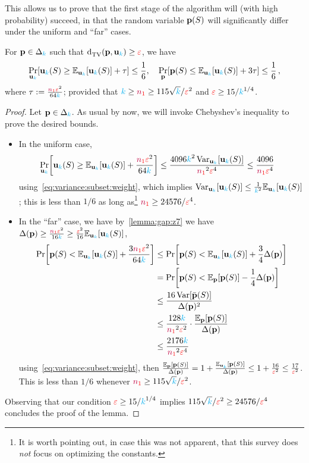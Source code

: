 This allows us to prove that the first stage of the algorithm will (with high probability) succeed, in that the random variable $\mathbf{p}(S)$ will significantly differ under the uniform and ``far'' cases. 
\begin{lemma}
  \label{lemma:empirical:subset:guarantee:pS}
  For $\mathbf{p}\in\Delta_{{\textcolor{cyan}{k}}}$ such that $\totalvardist{\p}{\uniform_\ab} \geq \dst$, we have
  \[
  \bP{\uniform_\ab}{\uniform_\ab(S) \geq \bE{\uniform_\ab}{\uniform_\ab(S)} + \tau} \leq \frac{1}{6}
  , \quad
  \bP{\p}{\p(S) \leq \bE{\uniform_\ab}{\uniform_\ab(S)} + 3\tau} \leq \frac{1}{6}\,,
  \]
  where $\tau := \frac{\textcolor{red}{{\textcolor{purple}{n}}_1}\textcolor{red}{\varepsilon}^2}{64{\textcolor{cyan}{k}}}$; provided that ${\textcolor{cyan}{k}} \geq \textcolor{red}{{\textcolor{purple}{n}}_1} \geq 115\sqrt{{\textcolor{cyan}{k}}}/\textcolor{red}{\varepsilon}^2$ and $\textcolor{red}{\varepsilon} \geq 15/{\textcolor{cyan}{k}}^{1/4}$.
\end{lemma}
\begin{proof}
Let $\mathbf{p}\in\Delta_{{\textcolor{cyan}{k}}}$. As usual by now, we will invoke Chebyshev's inequality to prove the desired bounds.
\begin{itemize}
    \item In the uniform case, 
    \begin{align*}
    \bP{\uniform_\ab}{\uniform_\ab(S) \geq \bE{\uniform_\ab}{\uniform_\ab(S)} + \frac{\nss\dst^2}{64\ab}} 
    &\leq \frac{4096\ab^2\Var_{\uniform_\ab}[\uniform_\ab(S)]}{\nss^2\dst^4} 
    \leq \frac{4096}{\nss\dst^4}
    \end{align*}
    using~\cref{eq:variance:subset:weight}, which implies $\Var_{\uniform_\ab}[\uniform_\ab(S)] \leq \frac{1}{\ab^2}\bE{\uniform_\ab}{\uniform_\ab(S)}$; this is less than $1/6$ as long as\footnote{It is worth pointing out, in case this was not apparent, that this survey does \emph{not} focus on optimizing the constants.} $\textcolor{red}{{\textcolor{purple}{n}}_1} \geq 24576/\textcolor{red}{\varepsilon}^4$.
    \item In the ``far'' case, we have by~\cref{lemma:gap:z7} we have $\Delta(\p) \geq \frac{\nss\dst^2}{16\ab} \geq \frac{\dst^2}{16}\bE{\uniform_\ab}{\uniform_\ab(S)}$, 
    \begin{align*}
        \bPr{\p(S) < \bE{\uniform_\ab}{\uniform_\ab(S)} + \frac{3\nss\dst^2}{64\ab}} 
        &\leq \bPr{\p(S) < \bE{\uniform_\ab}{\uniform_\ab(S)} + \frac{3}{4}\Delta(\p)}\\
        &= \bPr{\p(S) < \bE{\p}{\p(S)} - \frac{1}{4}\Delta(\p)} \\
        &\leq \frac{16\Var[\bar{\p}(S)]}{\Delta(\p)^2} \\
        &\leq \frac{128\ab}{\nss^2\dst^2}\cdot \frac{\bE{\p}{\p(S)}}{\Delta(\p)} \\
        &\leq \frac{2176\ab}{\nss^2\dst^4} 
    \end{align*}
    using~\cref{eq:variance:subset:weight}, then $\frac{\bE{\p}{\p(S)}}{\Delta(\p)} = 1+\frac{\bE{\uniform_\ab}{\p(S)}}{\Delta(\p)} \leq 1+\frac{16}{\dst^2} \leq \frac{17}{\dst^2}$. This is less than $1/6$ whenever $\textcolor{red}{{\textcolor{purple}{n}}_1} \geq 115\sqrt{{\textcolor{cyan}{k}}}/\textcolor{red}{\varepsilon}^2$.
\end{itemize}
Observing that our condition $\textcolor{red}{\varepsilon} \geq 15/{\textcolor{cyan}{k}}^{1/4}$ implies $115\sqrt{{\textcolor{cyan}{k}}}/\textcolor{red}{\varepsilon}^2\geq 24576/\textcolor{red}{\varepsilon}^4$ concludes the proof of the lemma.
\end{proof}

